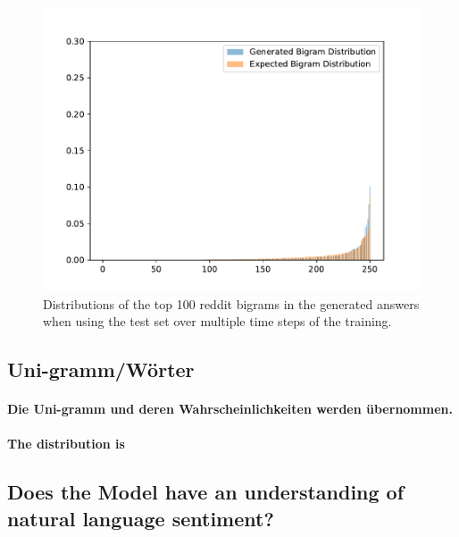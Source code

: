 \begin{figure}[H]
	\centering
	\small
	\endminipage\hfill
	\includegraphics[width=\linewidth]{img/plots/reddit/bigram_distribution_comparison_step_3000000.pdf}
	\centering
	\small
	\endminipage\hfill
	\caption{Distributions of the top 100 reddit bigrams in the generated answers when using the test set over multiple time steps of the training.}
	\label{results:ngram:distributions:reddit}
\end{figure}

\subsection{Uni-gramm/Wörter}
\paragraph{Die Uni-gramm und deren Wahrscheinlichkeiten werden übernommen.}
\paragraph{The distribution is}

\subsection{Does the Model have an understanding of natural language sentiment?}

